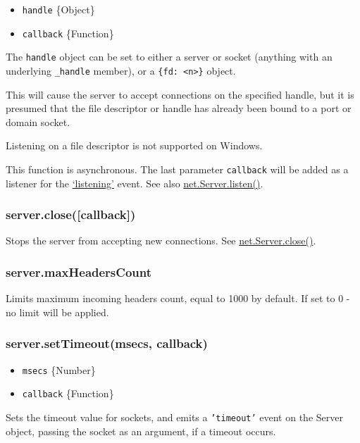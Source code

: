 \begin{itemize}
\item
  \texttt{handle} \{Object\}
\item
  \texttt{callback} \{Function\}
\end{itemize}

The \texttt{handle} object can be set to either a server or socket
(anything with an underlying \texttt{\_handle} member), or a
\texttt{\{fd: \textless{}n\textgreater{}\}} object.

This will cause the server to accept connections on the specified
handle, but it is presumed that the file descriptor or handle has
already been bound to a port or domain socket.

Listening on a file descriptor is not supported on Windows.

This function is asynchronous. The last parameter \texttt{callback} will
be added as a listener for the
\href{net.html\#event\_listening\_}{`listening'} event. See also
\href{net.html\#net\_server\_listen\_handle\_callback}{net.Server.listen()}.

\subsubsection{server.close({[}callback{]})}

Stops the server from accepting new connections. See
\href{net.html\#net\_server\_close\_callback}{net.Server.close()}.

\subsubsection{server.maxHeadersCount}

Limits maximum incoming headers count, equal to 1000 by default. If set
to 0 - no limit will be applied.

\subsubsection{server.setTimeout(msecs, callback)}

\begin{itemize}
\item
  \texttt{msecs} \{Number\}
\item
  \texttt{callback} \{Function\}
\end{itemize}

Sets the timeout value for sockets, and emits a \texttt{'timeout'} event
on the Server object, passing the socket as an argument, if a timeout
occurs.

